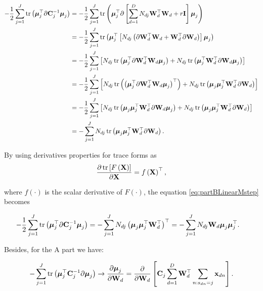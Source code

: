 	
	
	\begin{align}
	-\frac{1}{2}\sum_{j=1}^{J} \operatorname{tr}\left( \boldsymbol{\mu}_j^\top\partial\mathbf{C}_j^{-1}\boldsymbol{\mu}_j\right) &= -\frac{1}{2}\sum_{j=1}^{J} \operatorname{tr}\left( \boldsymbol{\mu}_j^\top\partial\left[\sum_{d=1}^{D}N_{dj}\mathbf{W}_d^\top\mathbf{W}_d+r\mathbf{I}\right]\boldsymbol{\mu}_j\right) \notag \\
	&=  -\frac{1}{2}\sum_{j=1}^{J} \operatorname{tr}\left( \boldsymbol{\mu}_j^\top\left[N_{dj}\left(\partial\mathbf{W}_d^\top\mathbf{W}_d+\mathbf{W}_d^\top\partial\mathbf{W}_d\right)\right]\boldsymbol{\mu}_j\right) \notag \\
	&=  -\frac{1}{2}\sum_{j=1}^{J} \left[N_{dj}\operatorname{tr}\left( \boldsymbol{\mu}_j^\top\partial\mathbf{W}_d^\top\mathbf{W}_d\boldsymbol{\mu}_j\right)+N_{dj}\operatorname{tr}\left(\boldsymbol{\mu}_j^\top\mathbf{W}_d^\top\partial\mathbf{W}_d\boldsymbol{\mu}_j\right)\right] \notag \\
	&=  -\frac{1}{2}\sum_{j=1}^{J} \left[N_{dj}\operatorname{tr}\left( \left(\boldsymbol{\mu}_j^\top\partial\mathbf{W}_d^\top\mathbf{W}_d\boldsymbol{\mu}_j\right)^\top\right)+N_{dj}\operatorname{tr}\left(\boldsymbol{\mu}_j\boldsymbol{\mu}_j^\top\mathbf{W}_d^\top\partial\mathbf{W}_d\right)\right] \notag\\
	&=  -\frac{1}{2}\sum_{j=1}^{J} \left[N_{dj}\operatorname{tr}\left( \boldsymbol{\mu}_j\boldsymbol{\mu}_j^\top\mathbf{W}_d^\top\partial\mathbf{W}_d\boldsymbol{\mu}_j\right)+N_{dj}\operatorname{tr}\left(\boldsymbol{\mu}_j\boldsymbol{\mu}_j^\top\mathbf{W}_d^\top\partial\mathbf{W}_d\right)\right] \notag\\
	&=  -\sum_{j=1}^{J} N_{dj}\operatorname{tr}\left( \boldsymbol{\mu}_j\boldsymbol{\mu}_j^\top\mathbf{W}_d^\top\partial\mathbf{W}_d\right).
	\label{eq:partBLinearMstep}
	\end{align}
	
	
	By using derivatives properties for trace forms as 
	\begin{align}
	\frac{\partial \operatorname{tr}\left[F\left(\mathbf{X}\right)\right]}{\partial \mathbf{X}} = f\left(\mathbf{X}\right)^\top,
	\end{align}
	
	where $f\left(\cdot\right)$ is the scalar derivative of $F\left(\cdot\right)$, the equation \eqref{eq:partBLinearMstep} becomes
	
	\begin{align}
	-\frac{1}{2}\sum_{j=1}^{J} \operatorname{tr}\left( \boldsymbol{\mu}_j^\top\partial\mathbf{C}_j^{-1}\boldsymbol{\mu}_j\right) &= -\sum_{j=1}^{J} N_{dj}\left( \boldsymbol{\mu}_j\boldsymbol{\mu}_j^\top\mathbf{W}_d^\top\right)^\top =  -\sum_{j=1}^{J} N_{dj} \mathbf{W}_d \boldsymbol{\mu}_j\boldsymbol{\mu}_j^\top.
	\end{align}
	
	Besides, for the A part we have:
	
	\begin{align}
	-\sum_{j=1}^{J}\operatorname{tr}\left( \boldsymbol{\mu}_j^\top\mathbf{C}_j^{-1}\partial\boldsymbol{\mu}_j\right) \rightarrow \frac{\partial \boldsymbol{\mu}_j}{\partial \mathbf{W}_d} = \frac{\partial}{\partial \mathbf{W}_d}\left[\mathbf{C}_j\sum_{d=1}^{D}\mathbf{W}_d^\top\sum_{n:s_{dn}=j}\mathbf{x}_{dn}\right].
	\end{align}
	
